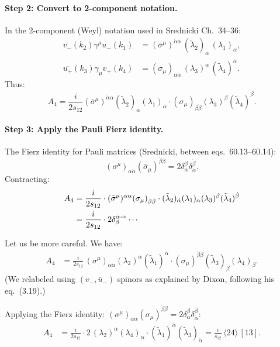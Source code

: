 \paragraph{Step 2: Convert to 2-component notation.}
In the 2-component (Weyl) notation used in Srednicki Ch.~34--36:
\begin{align}
  \overline{v_-}(k_2)\gamma^\mu u_-(k_1)
  &= (\bar\sigma^\mu)^{\dot\alpha\alpha}\,
     (\tilde\lambda_2)_{\dot\alpha}\,(\lambda_1)_\alpha, \\
  \overline{u_+}(k_3)\gamma_\mu v_+(k_4)
  &= (\sigma_\mu)_{\alpha\dot\alpha}\,
     (\lambda_3)^\alpha\,(\tilde\lambda_4)^{\dot\alpha}.
\end{align}
Thus:
\begin{equation}
  A_4 = \frac{i}{2s_{12}}
  (\bar\sigma^\mu)^{\dot\alpha\alpha}(\tilde\lambda_2)_{\dot\alpha}(\lambda_1)_\alpha\cdot
  (\sigma_\mu)_{\beta\dot\beta}(\lambda_3)^\beta(\tilde\lambda_4)^{\dot\beta}.
\end{equation}

\paragraph{Step 3: Apply the Pauli Fierz identity.}
The Fierz identity for Pauli matrices (Srednicki, between eqs.~60.13--60.14):
\begin{equation}
  (\sigma^\mu)_{\alpha\dot\alpha}(\bar\sigma_\mu)^{\dot\beta\beta}
  = 2\delta_\alpha^\beta\delta_{\dot\alpha}^{\dot\beta}.
  \tag{Pauli Fierz}
\end{equation}
Contracting:
\begin{align}
  A_4 &= \frac{i}{2s_{12}}\cdot
         (\bar\sigma^\mu)^{\dot\alpha\alpha}(\sigma_\mu)_{\beta\dot\beta}\cdot
         (\tilde\lambda_2)_{\dot\alpha}(\lambda_1)_\alpha(\lambda_3)^\beta(\tilde\lambda_4)^{\dot\beta}
  \notag\\
  &= \frac{i}{2s_{12}}\cdot 2\delta_\beta^{\dot\alpha\to}\cdots
\end{align}

Let us be more careful. We have:
\begin{align}
  A_4 &= \frac{i}{2s_{12}}\,
  (\sigma^\mu)_{\alpha\dot\alpha}(\lambda_2)^\alpha(\tilde\lambda_1)^{\dot\alpha}\cdot
  (\sigma_\mu)^{\dot\beta\beta}(\tilde\lambda_3)_{\dot\beta}(\lambda_4)_\beta.
  \label{eq:A4step1}
\end{align}
(We relabeled using $(v_-,\bar u_-)$ spinors as explained by Dixon, following his eq.~(3.19).)

Applying the Fierz identity:
$(\sigma^\mu)_{\alpha\dot\alpha}(\sigma_\mu)^{\dot\beta\beta} = 2\delta_\alpha^\beta\delta_{\dot\alpha}^{\dot\beta}$:
\begin{align}
  A_4 &= \frac{i}{2s_{12}}\cdot 2\,(\lambda_2)^\alpha(\lambda_4)_\alpha\cdot
          (\tilde\lambda_1)^{\dot\alpha}(\tilde\lambda_3)_{\dot\alpha}
   = \frac{i}{s_{12}}\,\langle 24\rangle\,[13].
   \label{eq:A4intermediate}
\end{align}

